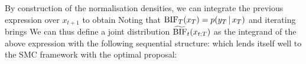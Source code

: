 %
By construction of the normalisation densities, we can integrate the previous expression over $x_{t+1}$ to obtain
%
%
Noting that $\text{BIF}_{T}(x_{T})=p(y_{T}\,|\, x_{T})$ and iterating brings
%
%
We can thus define a joint distribution $\widetilde{\text{BIF}}_{t}(x_{t:T})$ as the integrand of the above expression with the following sequential structure:
which lends itself well to the SMC framework with the optimal proposal:
%
%

